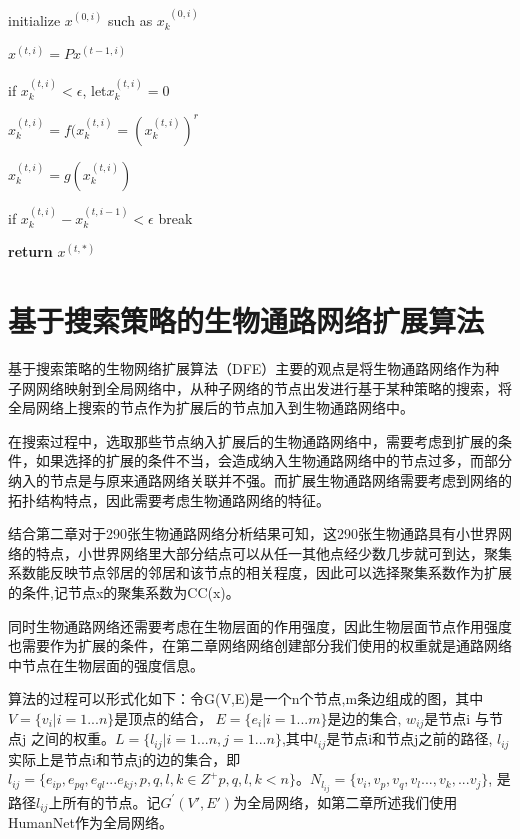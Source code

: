 \begin{algorithm}

%

{
	initialize $x^{(0, i)}$ such as $x^{\ \ ( 0,i)}_{k}$
    
	{
		$x^{(t,i)}=Px^{(t-1,i)}$

		if $x^{(t,i)}_{k} < \epsilon$, let$ x^{(t,i)}_{k}=0 $	

		 $x^{(t,i)}_{k}=f(x^{(t,i)}_{k}=(x^{(t,i)}_{k})^{r}$

		 $x^{(t,i)}_{k}=g(x^{(t,i)}_{k})$

		if  $x^{(t,i)}_{k} -  x^{(t,i-1)}_{k} < \epsilon$ break

 	}
}


\textbf{return} $x^{(t, *)}$
\end{algorithm}

\section{基于搜索策略的生物通路网络扩展算法}
基于搜索策略的生物网络扩展算法（DFE）主要的观点是将生物通路网络作为种子网网络映射到全局网络中，从种子网络的节点出发进行基于某种策略的搜索，将全局网络上搜索的节点作为扩展后的节点加入到生物通路网络中。

在搜索过程中，选取那些节点纳入扩展后的生物通路网络中，需要考虑到扩展的条件，如果选择的扩展的条件不当，会造成纳入生物通路网络中的节点过多，而部分纳入的节点是与原来通路网络关联并不强。而扩展生物通路网络需要考虑到网络的拓扑结构特点，因此需要考虑生物通路网络的特征。

结合第二章对于290张生物通路网络分析结果可知，这290张生物通路具有小世界网络的特点，小世界网络里大部分结点可以从任一其他点经少数几步就可到达，聚集系数能反映节点邻居的邻居和该节点的相关程度，因此可以选择聚集系数作为扩展的条件,记节点x的聚集系数为CC(x)。

同时生物通路网络还需要考虑在生物层面的作用强度，因此生物层面节点作用强度也需要作为扩展的条件，在第二章网络网络创建部分我们使用的权重就是通路网络中节点在生物层面的强度信息。

算法的过程可以形式化如下：令G(V,E)是一个n个节点,m条边组成的图，其中$V=\{v_{i} |i=1...n\}$是顶点的结合，$\ E=\{e_{i} |i=1...m\}$是边的集合, $w_{ij}$是节点i 与节点j 之间的权重。$L= \{l_{ij} | i=1...n, j=1...n \}$,其中$l_{ij}$是节点i和节点j之前的路径, $l_{ij}$实际上是节点i和节点j的边的集合，即$l_{ij}=\{e_{ip} , e_{pq}, e_{ql}...e_{kj}, p,q,l,k\in Z^{+} p,q,l,k < n \}$。$N_{l_{ij}}=\{v_{i}, v_{p}, v_{q}, v_{l}...,v_{k},...v_{j}\}$, 是路径$l_{ij}$上所有的节点。记$G^{'}(V', E')$为全局网络，如第二章所述我们使用HumanNet作为全局网络。

